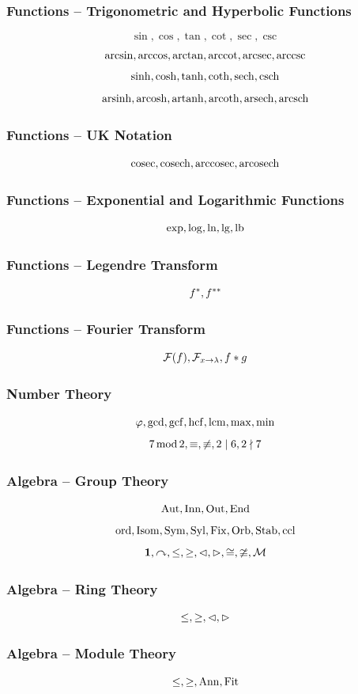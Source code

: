 \documentclass{beamer}
\begin{document}
\begin{frame}
    \frametitle{Functions -- Trigonometric and Hyperbolic Functions}
    \[
        \sin, \cos, \tan, \cot, \sec, \csc
    \]
    \[
        \arcsin, \arccos, \arctan, \arccot, \arcsec, \arccsc
    \]
    \[
        \sinh, \cosh, \tanh, \coth, \sech, \csch
    \]
    \[
        \operatorname{arsinh}, \operatorname{arcosh}, \operatorname{artanh}, \operatorname{arcoth}, \operatorname{arsech}, \operatorname{arcsch}
    \]
\end{frame}

\begin{frame}
    \frametitle{Functions -- UK Notation}
    \[
        \operatorname{cosec}, \operatorname{cosech}, \operatorname{arccosec}, \operatorname{arcosech}
    \]
\end{frame}

\begin{frame}
    \frametitle{Functions -- Exponential and Logarithmic Functions}
    \[
        \exp, \log, \ln, \lg, \operatorname{lb}
    \]
\end{frame}

\begin{frame}
    \frametitle{Functions -- Legendre Transform}
    \[
        {f}^{\ast}, {f}^{\ast\ast}
    \]
\end{frame}

\begin{frame}
    \frametitle{Functions -- Fourier Transform}
    \[
        \fourier\pqty{f}, \fourier[x][\lambda], f \convolution g
    \]
\end{frame}

\begin{frame}
    \frametitle{Number Theory}
    \[
        \varphi, \gcd, \operatorname{gcf}, \operatorname{hcf}, \operatorname{lcm}, \max, \min
    \]
    \[
        7 \operatorname{mod} 2, \equiv, \not\equiv, 2 \mid 6, 2 \nmid 7
    \]
\end{frame}

\begin{frame}
    \frametitle{Algebra -- Group Theory}
    \[
    \operatorname{Aut}, \operatorname{Inn}, \operatorname{Out}, \operatorname{End}
    \]
    \[
        \operatorname{ord}, \operatorname{Isom}, \operatorname{Sym}, \operatorname{Syl}, \operatorname{Fix}, \operatorname{Orb}, \operatorname{Stab}, \operatorname{ccl}
    \]
    \[
        \mathbf{1}, \curvearrowright, \leq, \geq, \lhd, \rhd, \cong, \ncong, \mathcal{M}
    \]
\end{frame}

\begin{frame}
    \frametitle{Algebra -- Ring Theory}
    \[
        \leq, \geq, \lhd, \rhd
    \]
\end{frame}

\begin{frame}
    \frametitle{Algebra -- Module Theory}
    \[
        \leq, \geq, \operatorname{Ann}, \operatorname{Fit}
    \]
\end{frame}
\end{document}

